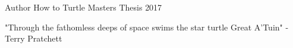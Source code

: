 

\begin{cventries}

  \cventry
    {Author} %
    {How to Turtle} %
    {Masters Thesis} %
    {2017} %
    {
      \begin{cvitems} %
        \item {"Through the fathomless deeps of space swims the star turtle Great A'Tuin" - Terry Pratchett}
      \end{cvitems}
    }

\end{cventries}
